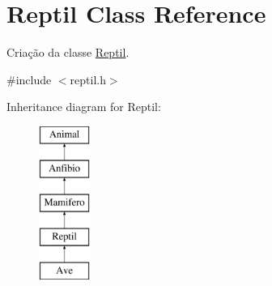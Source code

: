 \hypertarget{class_reptil}{}\section{Reptil Class Reference}
\label{class_reptil}


Criação da classe \mbox{\hyperlink{class_reptil}{Reptil}}.  




{\ttfamily \#include $<$reptil.\+h$>$}

Inheritance diagram for Reptil\+:\begin{figure}[H]
\begin{center}
\leavevmode
\includegraphics[height=5.000000cm]{class_reptil}
\end{center}
\end{figure}
